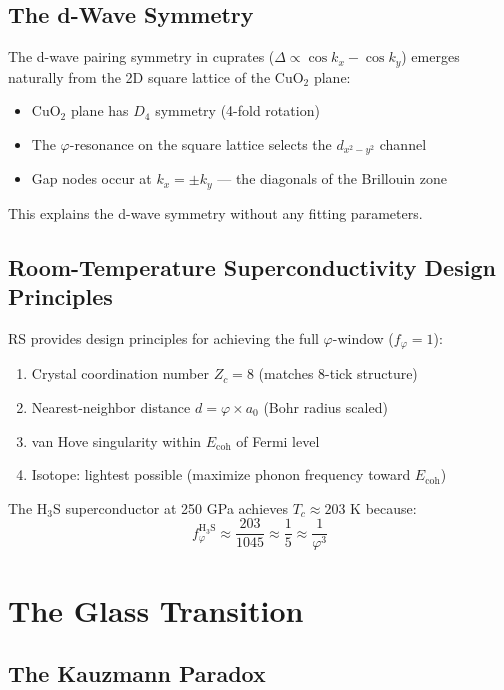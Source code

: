\documentclass[12pt,a4paper]{article}
\theoremstyle{definition}
\theoremstyle{remark}
\begin{document}
\subsection{The d-Wave Symmetry}

The d-wave pairing symmetry in cuprates ($\Delta \propto \cos k_x - \cos k_y$) 
emerges naturally from the 2D square lattice of the CuO$_2$ plane:
\begin{itemize}
\item CuO$_2$ plane has $D_4$ symmetry (4-fold rotation)
\item The $\varphi$-resonance on the square lattice selects the $d_{x^2-y^2}$ channel
\item Gap nodes occur at $k_x = \pm k_y$ — the diagonals of the Brillouin zone
\end{itemize}

This explains the d-wave symmetry without any fitting parameters.

\subsection{Room-Temperature Superconductivity Design Principles}

RS provides design principles for achieving the full $\varphi$-window ($f_\varphi = 1$):
\begin{enumerate}
\item Crystal coordination number $Z_c = 8$ (matches 8-tick structure)
\item Nearest-neighbor distance $d = \varphi \times a_0$ (Bohr radius scaled)
\item van Hove singularity within $E_\mathrm{coh}$ of Fermi level
\item Isotope: lightest possible (maximize phonon frequency toward $E_\mathrm{coh}$)
\end{enumerate}

The H$_3$S superconductor at 250 GPa achieves $T_c \approx 203$ K because:
\begin{equation}
f_\varphi^\mathrm{H_3S} \approx \frac{203}{1045} \approx \frac{1}{5} \approx \frac{1}{\varphi^3}
\end{equation}

\section{The Glass Transition}

\subsection{The Kauzmann Paradox}
\end{document}
